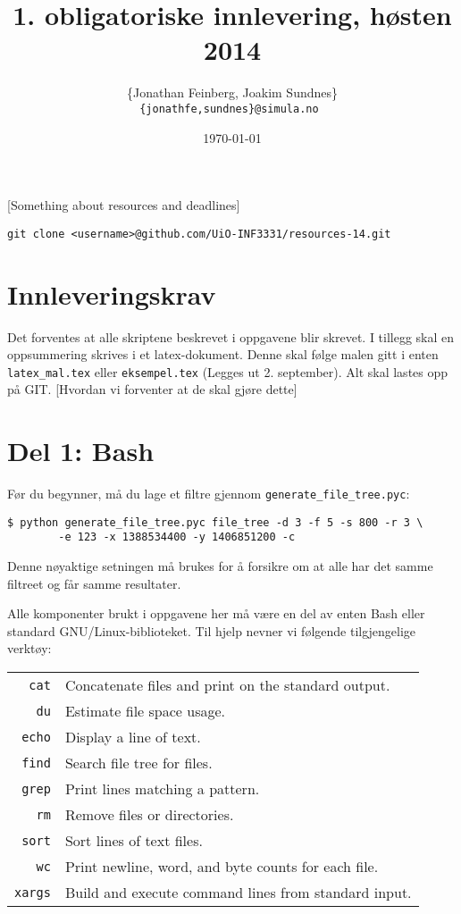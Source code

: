 \documentclass{article}
\author{
\{Jonathan Feinberg, Joakim Sundnes\} \\
\tt{\{jonathfe,sundnes\}@simula.no}
}
\date{\today}
\title{1. obligatoriske innlevering, høsten 2014}
\begin{document}
\maketitle

[Something about resources and deadlines]
\begin{verbatim}
git clone <username>@github.com/UiO-INF3331/resources-14.git
\end{verbatim}

\section*{Innleveringskrav}

Det forventes at alle skriptene beskrevet i oppgavene blir skrevet.
I tillegg skal en oppsummering skrives i et latex-dokument.
Denne skal følge malen gitt i enten \verb;latex_mal.tex; eller
\verb;eksempel.tex; (Legges ut 2. september).
Alt skal lastes opp på GIT.
[Hvordan vi forventer at de skal gjøre dette]

\section*{Del 1: Bash}

Før du begynner, må du lage et filtre gjennom
\verb;generate_file_tree.pyc;:
\begin{Verbatim}[fontsize=\small, frame=single]
$ python generate_file_tree.pyc file_tree -d 3 -f 5 -s 800 -r 3 \
        -e 123 -x 1388534400 -y 1406851200 -c
\end{Verbatim}
Denne nøyaktige setningen må brukes for å forsikre om at alle har
det samme filtreet og får samme resultater.

Alle komponenter brukt i oppgavene her må være en del av enten Bash
eller standard GNU/Linux-biblioteket.
Til hjelp nevner vi følgende tilgjengelige verktøy:

\begin{tabular}{rl}
    \verb;cat;      &   Concatenate files and print on the standard output. \\
    \verb;du;       &   Estimate file space usage. \\
    \verb;echo;     &   Display a line of text. \\
    \verb;find;     &   Search file tree for files. \\
    \verb;grep;     &   Print lines matching a pattern. \\
    \verb;rm;       &   Remove files or directories.\\
    \verb;sort;     &   Sort lines of text files. \\
    \verb;wc;       &   Print newline, word, and byte counts for each file. \\
    \verb;xargs;    &   Build and execute command lines from standard input.
\end{tabular}
\end{document}

